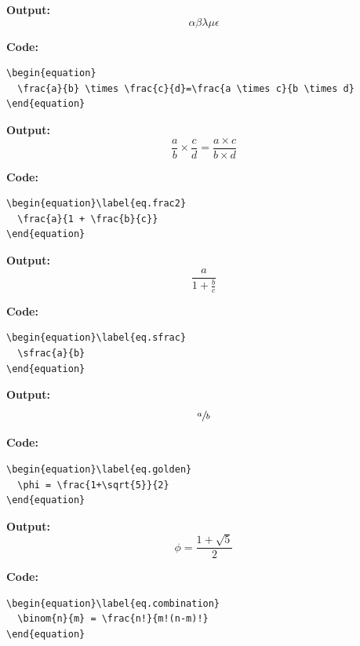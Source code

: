 \documentclass{book}
\newcommand{\myc}{\noindent\textbf{{\color{blue} Code}:}}
\newcommand{\myo}{\noindent\textbf{{\color{blue} Output}:\\}}
\begin{document}
\myo
\begin{equation}\label{eq.greeks}
  \alpha \beta \lambda \mu \epsilon
\end{equation}

\myc
\begin{lstlisting}
\begin{equation}
  \frac{a}{b} \times \frac{c}{d}=\frac{a \times c}{b \times d}
\end{equation}
\end{lstlisting}

\myo
\begin{equation}
  \frac{a}{b} \times \frac{c}{d}=\frac{a \times c}{b \times d}
\end{equation}


\myc
\begin{lstlisting}
\begin{equation}\label{eq.frac2}
  \frac{a}{1 + \frac{b}{c}}
\end{equation}
\end{lstlisting}

\myo
\begin{equation}\label{eq.frac2}
  \frac{a}{1 + \frac{b}{c}}
\end{equation}


\myc
\begin{lstlisting}
\begin{equation}\label{eq.sfrac}
  \sfrac{a}{b}
\end{equation}
\end{lstlisting}

\myo
\begin{equation}\label{eq.sfrac}
  \sfrac{a}{b}
\end{equation}


\myc
\begin{lstlisting}
\begin{equation}\label{eq.golden}
  \phi = \frac{1+\sqrt{5}}{2}
\end{equation}
\end{lstlisting}

\myo
\begin{equation}\label{eq.golden}
  \phi = \frac{1+\sqrt{5}}{2}
\end{equation}


\myc
\begin{lstlisting}
\begin{equation}\label{eq.combination}
  \binom{n}{m} = \frac{n!}{m!(n-m)!}
\end{equation}
\end{lstlisting}
\end{document}
